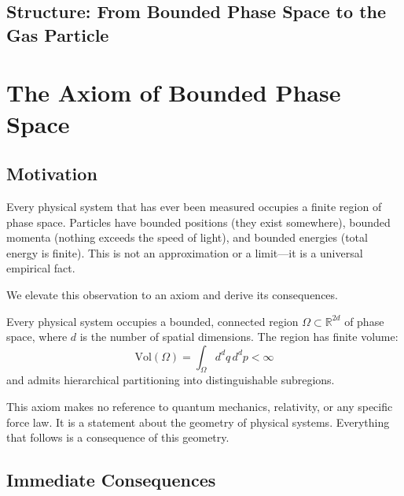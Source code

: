 
\subsection{Structure: From Bounded Phase Space to the Gas Particle}
\label{part:structure}

\section{The Axiom of Bounded Phase Space}
\label{sec:axiom}

\subsection{Motivation}

Every physical system that has ever been measured occupies a finite region of phase space. Particles have bounded positions (they exist somewhere), bounded momenta (nothing exceeds the speed of light), and bounded energies (total energy is finite). This is not an approximation or a limit---it is a universal empirical fact.

We elevate this observation to an axiom and derive its consequences.

\begin{axiom}
\label{ax:bps}
Every physical system occupies a bounded, connected region $\Omega \subset \mathbb{R}^{2d}$ of phase space, where $d$ is the number of spatial dimensions. The region has finite volume:
\begin{equation}
    \mathrm{Vol}(\Omega) = \int_\Omega d^d q \, d^d p < \infty
\end{equation}
and admits hierarchical partitioning into distinguishable subregions.
\end{axiom}

\begin{remark}
This axiom makes no reference to quantum mechanics, relativity, or any specific force law. It is a statement about the geometry of physical systems. Everything that follows is a consequence of this geometry.
\end{remark}

\subsection{Immediate Consequences}

